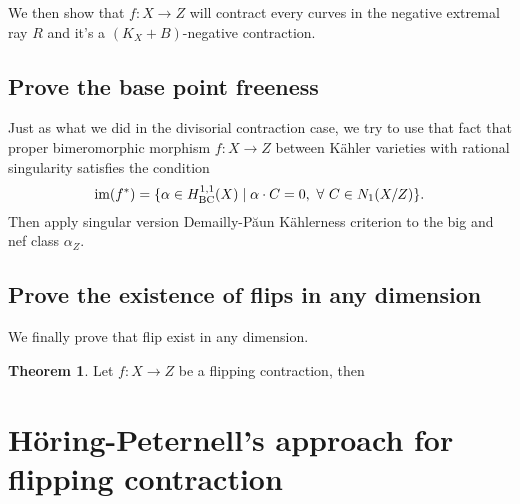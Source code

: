 \documentclass[11pt]{article}
\theoremstyle{definition}
\newtheorem{theorem}{Theorem}
\begin{document}
	We then show that $f:X\to Z$ will contract every curves in the negative extremal ray $R$ and it's a $(K_X+B)$-negative contraction.
	
	
	\subsection{Prove the base point freeness}
	Just as what we did in the divisorial contraction case, we try to use that fact that proper bimeromorphic morphism $f:X\to Z$ between K\"ahler varieties with rational singularity satisfies the condition $$\text{im}(f^*) = \{\alpha \in H^{1,1}_{\rm{BC}}(X)\mid \alpha \cdot C = 0 ,\ \forall\ C\in N_1(X/Z)\}.$$Then apply singular version Demailly-P\u{a}un K\"ahlerness criterion to the big and nef class $\alpha_Z$.
	
	\subsection{Prove the existence of flips in any dimension}
	We finally prove that flip exist in any dimension. 
	
	\begin{theorem}
		Let $f: X\to Z$ be a flipping contraction, then 
	\end{theorem}
	
	\section{H\"oring-Peternell's approach for flipping contraction}
	
	
	
	
	
	
\end{document}

